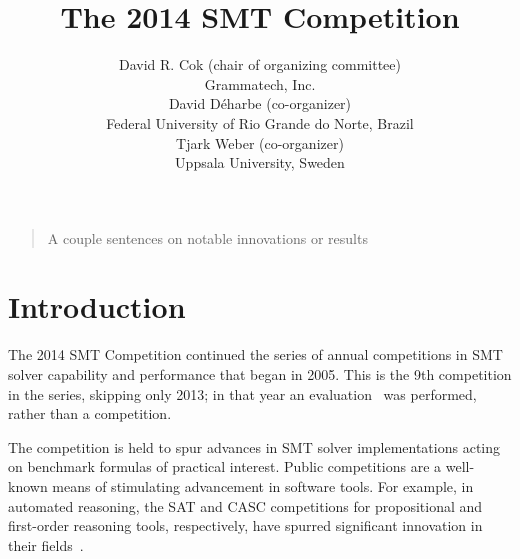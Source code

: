 \documentclass[twosize,11pt]{article}
\newcommand{\tjark}[1]{\begin{quote}\sc #1\marginpar{\textcolor{red}{$\ast^{\mbox{TW}}$}}\end{quote}}
\newcommand{\tjarkx}[1]{\tjark{#1}}
\begin{document}
\title{The 2014 SMT Competition}

\author{
\name David R. Cok (chair of organizing committee)
 \\
\addr Grammatech, Inc. \\
\AND
\name David D\'{e}harbe (co-organizer)
 \\
\addr Federal University of Rio Grande do Norte, Brazil \\ 
\AND
\name Tjark Weber (co-organizer) \\
\addr Uppsala University, Sweden
}

\maketitle

\tjarkx{A couple sentences on notable innovations or results}



\section{Introduction}
\label{sec:intro}

The 2014 SMT Competition continued the series of annual competitions in SMT solver capability and performance that began in 2005. This is the 9th competition in the series, skipping only 2013; in that year an evaluation~\cite{it:2014-017} was performed, rather than a competition.

The competition is held to spur advances in
SMT solver implementations acting on benchmark formulas of practical interest. Public competitions are
a well-known means of stimulating advancement in software tools. For example, in automated
reasoning, the SAT and CASC competitions for propositional and first-order reasoning tools, respectively,
have spurred significant innovation in their fields~\cite{leberre+03,PSS02}.
\end{document}
